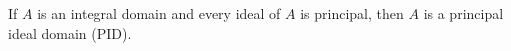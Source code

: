 If $A$ is an integral domain and every ideal of $A$ is principal, then $A$ is a principal ideal domain (PID).
